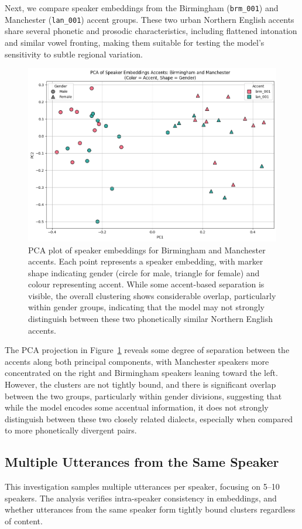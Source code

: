 \documentclass[conference]{IEEEtran}
\begin{document}
Next, we compare speaker embeddings from the Birmingham (\texttt{brm\_001}) and Manchester (\texttt{lan\_001}) accent groups. These two urban Northern English accents share several phonetic and prosodic characteristics, including flattened intonation and similar vowel fronting, making them suitable for testing the model's sensitivity to subtle regional variation. 



\begin{figure}
	\centering
	\includegraphics[width=0.7\linewidth]{img/img-cluster-brm-lan}
	\caption{PCA plot of speaker embeddings for Birmingham and Manchester  accents. Each point represents a speaker embedding, with marker shape indicating gender (circle for male, triangle for female) and colour representing accent. While some accent-based separation is visible, the overall clustering shows considerable overlap, particularly within gender groups, indicating that the model may not strongly distinguish between these two phonetically similar Northern English accents.}
	\label{fig:img-cluster-brm-lan}
\end{figure}

The PCA projection in Figure~\ref{fig:img-cluster-brm-lan} reveals some degree of separation between the accents along both principal components, with Manchester speakers more concentrated on the right and Birmingham speakers leaning toward the left. However, the clusters are not tightly bound, and there is significant overlap between the two groups, particularly within gender divisions, suggesting that while the model encodes some accentual information, it does not strongly distinguish between these two closely related dialects, especially when compared to more phonetically divergent pairs.








\subsection{Multiple Utterances from the Same Speaker}
This investigation samples multiple utterances per speaker, focusing on 5–10 speakers. The analysis verifies intra-speaker consistency in embeddings, and whether utterances from the same speaker form tightly bound clusters regardless of content.
\end{document}
